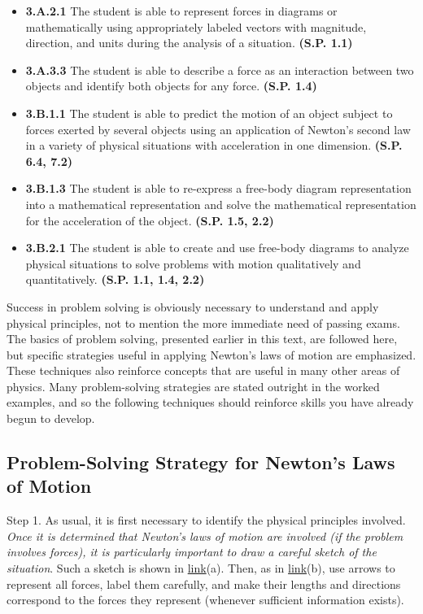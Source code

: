 \documentclass[
]{book}
\providecommand{\tightlist}{%
  \setlength{\itemsep}{0pt}\setlength{\parskip}{0pt}}
\begin{document}
\begin{itemize}
\tightlist
\item
  \textbf{3.A.2.1} The student is able to represent forces in diagrams or
  mathematically using appropriately labeled vectors with magnitude,
  direction, and units during the analysis of a situation. \textbf{(S.P.
  1.1)}
\item
  \textbf{3.A.3.3} The student is able to describe a force as an
  interaction between two objects and identify both objects for any
  force. \textbf{(S.P. 1.4)}
\item
  \textbf{3.B.1.1} The student is able to predict the motion of an object
  subject to forces exerted by several objects using an application of
  Newton's second law in a variety of physical situations with
  acceleration in one dimension. \textbf{(S.P. 6.4, 7.2)}
\item
  \textbf{3.B.1.3} The student is able to re-express a free-body diagram
  representation into a mathematical representation and solve the
  mathematical representation for the acceleration of the object.
  \textbf{(S.P. 1.5, 2.2)}
\item
  \textbf{3.B.2.1} The student is able to create and use free-body diagrams
  to analyze physical situations to solve problems with motion
  qualitatively and quantitatively. \textbf{(S.P. 1.1, 1.4, 2.2)}
\end{itemize}

Success in problem solving is obviously necessary to understand and
apply physical principles, not to mention the more immediate need of
passing exams. The basics of problem solving, presented earlier in this
text, are followed here, but specific strategies useful in applying
Newton's laws of motion are emphasized. These techniques also reinforce
concepts that are useful in many other areas of physics. Many
problem-solving strategies are stated outright in the worked examples,
and so the following techniques should reinforce skills you have already
begun to develop.

\hypertarget{import-auto-id2655652}{}
\hypertarget{problem-solving-strategy-for-newtons-laws-of-motion}{%
\subsection{Problem-Solving Strategy for Newton's Laws of Motion}\label{problem-solving-strategy-for-newtons-laws-of-motion}}

Step 1. As usual, it is first necessary to identify the physical
principles involved. \emph{Once it is determined that Newton's laws of motion
are involved (if the problem involves forces), it is particularly
important to draw a careful sketch of the situation}. Such a sketch is
shown in \protect\hyperlink{import-auto-id1669409}{link}(a).
Then, as in \protect\hyperlink{import-auto-id1669409}{link}(b),
use arrows to represent all forces, label them carefully, and make their
lengths and directions correspond to the forces they represent (whenever
sufficient information exists).
\end{document}
